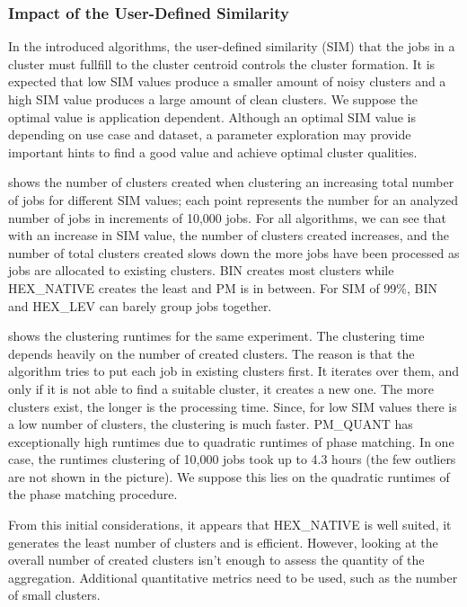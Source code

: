 \documentclass{jhps}
\begin{document}
\subsubsection{Impact of the User-Defined Similarity}
In the introduced algorithms, the user-defined similarity (SIM) that the jobs in a cluster must fullfill to the cluster centroid controls the cluster formation.
It is expected that low SIM values produce a smaller amount of noisy clusters and a high SIM value produces a large amount of clean clusters.
We suppose the optimal value is application dependent.
Although an optimal SIM value is depending on use case and dataset, a parameter exploration may provide important hints to find a good value and achieve optimal cluster qualities.

 shows the number of clusters created when clustering an increasing total number of jobs for different SIM values; each point represents the number for an analyzed number of jobs in increments of 10,000 jobs.
For all algorithms, we can see that with an increase in SIM value, the number of clusters created increases, and the number of total clusters created slows down the more jobs have been processed as jobs are allocated to existing clusters.
BIN creates most clusters while HEX\_NATIVE creates the least and PM is in between.
For SIM of 99\%, BIN and HEX\_LEV can barely group jobs together.


 shows the clustering runtimes for the same experiment.
The clustering time depends heavily on the number of created clusters.
The reason is that the algorithm tries to put each job in existing clusters first.
It iterates over them, and only if it is not able to find a suitable cluster, it creates a new one.
The more clusters exist, the longer is the processing time.
Since, for low SIM values there is a low number of clusters, the clustering is much faster.
PM\_QUANT has exceptionally high runtimes due to quadratic runtimes of phase matching.
In one case, the runtimes clustering of 10,000 jobs took up to 4.3 hours (the few outliers are not shown in the picture).
We suppose this lies on the quadratic runtimes of the phase matching procedure.

From this initial considerations, it appears that HEX\_NATIVE is well suited, it generates the least number of clusters and is efficient.
However, looking at the overall number of created clusters isn't enough to assess the quantity of the aggregation.
Additional quantitative metrics need to be used, such as the number of small clusters.
\end{document}
